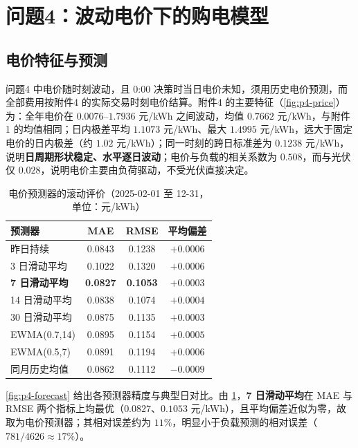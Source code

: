 \section{问题4：波动电价下的购电模型}

\subsection{电价特征与预测}

问题4 中电价随时刻波动，且 0:00 决策时当日电价未知，须用历史电价预测，而全部费用按附件4 的实际交易时刻电价结算。附件4 的主要特征（\cref{fig:p4-price}）为：全年电价在 $0.0076$--$1.7936$ 元/kWh 之间波动，均值 $0.7662$ 元/kWh，与附件1 的均值相同；日内极差平均 $1.1073$ 元/kWh、最大 $1.4995$ 元/kWh，远大于固定电价的日内极差（约 $1.02$ 元/kWh）；同一时刻的跨日标准差为 $0.1238$ 元/kWh，说明\textbf{日周期形状稳定、水平逐日波动}；电价与负载的相关系数为 $0.508$，而与光伏仅 $0.028$，说明电价主要由负荷驱动，不受光伏直接决定。

\begin{table}[H]
  \centering
  \caption{电价预测器的滚动评价（2025-02-01 至 12-31，单位：元/kWh）}
  \label{tab:p4-pred}
  \small
  \begin{tabular}{lccc}
    \toprule[1.5pt]
    预测器 & MAE & RMSE & 平均偏差 \\
    \midrule[1pt]
    昨日持续     & 0.0843 & 0.1238 & $+0.0006$ \\
    3 日滑动平均  & 0.1022 & 0.1320 & $+0.0006$ \\
    \textbf{7 日滑动平均} & \textbf{0.0827} & \textbf{0.1053} & $+0.0003$ \\
    14 日滑动平均 & 0.0838 & 0.1074 & $+0.0004$ \\
    30 日滑动平均 & 0.0875 & 0.1135 & $+0.0003$ \\
    EWMA(0.7,14) & 0.0895 & 0.1154 & $+0.0005$ \\
    EWMA(0.5,7)  & 0.0891 & 0.1194 & $+0.0006$ \\
    同月历史均值  & 0.0862 & 0.1112 & $-0.0009$ \\
    \bottomrule[1.5pt]
  \end{tabular}
\end{table}

\cref{fig:p4-forecast} 给出各预测器精度与典型日对比。由 \cref{tab:p4-pred}，\textbf{7 日滑动平均}在 MAE 与 RMSE 两个指标上均最优（$0.0827$、$0.1053$ 元/kWh），且平均偏差近似为零，故取为电价预测器；其相对误差约为 $11\%$，明显小于负载预测的相对误差（$781/4626\approx17\%$）。

